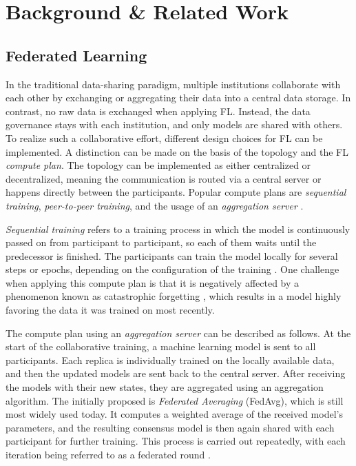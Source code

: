 \section{Background \& Related Work}
\label{sec:RelatedWork}

\subsection{Federated Learning}
\label{subsec:FederatedLearning}

In the traditional data-sharing paradigm, multiple institutions collaborate with each other by exchanging or aggregating their data into a central data storage. In contrast, no raw data is exchanged when applying FL. Instead, the data governance stays with each institution, and only models are shared with others.
To realize such a collaborative effort, different design choices for FL can be implemented. A distinction can be made on the basis of the topology and the FL \textit{compute plan}. The topology can be implemented as either centralized or decentralized, meaning the communication is routed via a central server or happens directly between the participants. Popular compute plans are \textit{sequential training}, \textit{peer-to-peer training}, and the usage of an \textit{aggregation server} \citep{Rieke2020TheLearning}.

\textit{Sequential training} refers to a training process in which the model is continuously passed on from participant to participant, so each of them waits until the predecessor is finished. The participants can train the model locally for several steps or epochs, depending on the configuration of the training \citep{Chang2018DistributedImaging}. One challenge when applying this compute plan is that it is negatively affected by a phenomenon known as catastrophic forgetting \citep{French1999CatastrophicNetworks}, which results in a model highly favoring the data it was trained on most recently.

The compute plan using an \textit{aggregation server} can be described as follows. At the start of the collaborative training, a machine learning model is sent to all participants. Each replica is individually trained on the locally available data, and then the updated models are sent back to the central server. After receiving the models with their new states, they are aggregated using an aggregation algorithm. The initially proposed is \textit{Federated Averaging} (FedAvg), which is still most widely used today. It computes a weighted average of the received model's parameters, and the resulting consensus model is then again shared with each participant for further training. This process is carried out repeatedly, with each iteration being referred to as a federated round \citep{BrendanMcMahan2017}.

